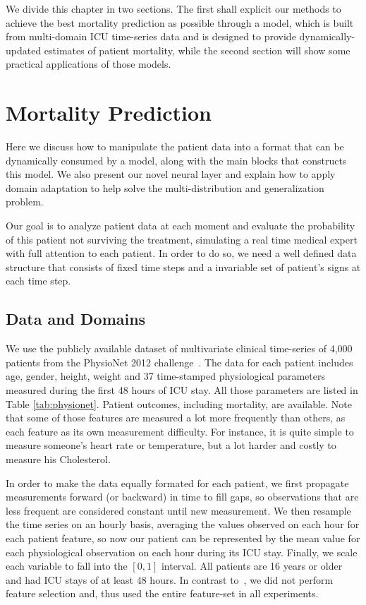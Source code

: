 We divide this chapter in two sections. The first shall explicit our methods to achieve the best mortality prediction as possible through a  model, which is built from multi-domain ICU time-series data and is designed to provide dynamically-updated estimates of patient mortality, while the second section will show some practical applications of those models.

\section{Mortality Prediction}

Here we discuss how to manipulate the patient data into a format that can be dynamically consumed by a model, along with the main blocks that constructs this model. We also present our novel neural layer and explain how to apply domain adaptation to help solve the multi-distribution and generalization problem.

Our goal is to analyze patient data at each moment and evaluate the probability of this patient not surviving the treatment, simulating a real time medical expert with full attention to each patient. In order to do so, we need a well defined data structure that consists of fixed time steps and a invariable set of patient's signs at each time step.

\subsection{Data and Domains}

We use the publicly available dataset of multivariate clinical time-series of 4,000 patients from the PhysioNet 2012 challenge~\citep{silva}. The data for each patient includes age, gender, height, weight and 37 time-stamped physiological parameters measured during the first 48 hours of ICU stay. All those parameters are listed in Table \ref{tab:physionet}. Patient outcomes, including mortality, are available. Note that some of those features are measured a lot more frequently than others, as each feature as its own measurement difficulty. For instance, it is quite simple to measure someone's heart rate or temperature, but a lot harder and costly to measure his Cholesterol.

In order to make the data equally formated for each patient, we first propagate measurements forward (or backward) in time to fill gaps, so observations that are less frequent are considered constant until new measurement. We then resample the time series on an hourly basis, averaging the values observed on each hour for each patient feature, so now our patient can be represented by the mean value for each physiological observation on each hour during its ICU stay. Finally, we scale each variable to fall into the $[0,1]$ interval. All patients are 16 years or older and had ICU stays of at least 48 hours. In contrast to~\citet{imbalance}, we did not perform feature selection and, thus used the entire feature-set in all experiments.

